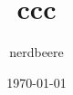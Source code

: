 \documentclass[a4paper]{article}
\begin{document}
\title{ccc}
\author{nerdbeere}
\date{\today}

\maketitle
\end{document}
